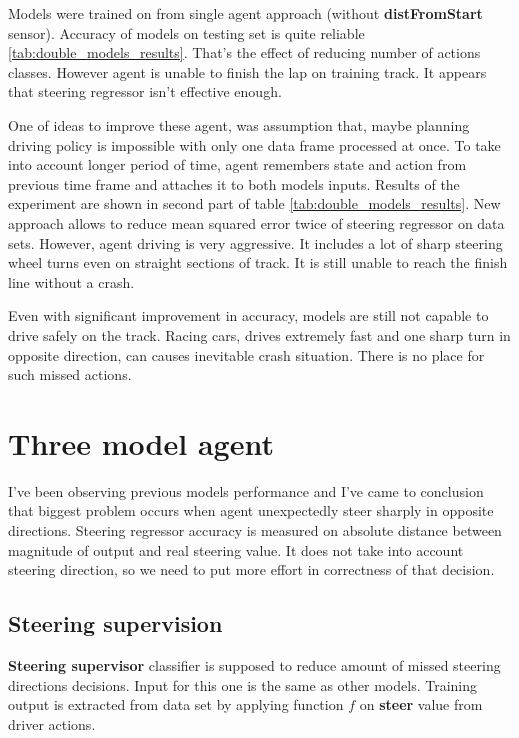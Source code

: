 \documentclass[declaration,shortabstract,english,inz]{iithesis}
\begin{document}
Models were trained on from single agent approach (without \textbf{distFromStart} sensor).
Accuracy of models on testing set is quite reliable \ref{tab:double_models_results}.
That's the effect of reducing number of actions classes.
However agent is unable to finish the lap on training track.
It appears that steering regressor isn't effective enough.


One of ideas to improve these agent, was assumption that, maybe planning driving policy is impossible with only one data frame processed at once.
To take into account longer period of time, agent remembers state and action from previous time frame and attaches it to both models inputs.
Results of the experiment are shown in second part of table \ref{tab:double_models_results}.
New approach allows to reduce mean squared error twice of steering regressor on data sets.
However, agent driving is very aggressive.
It includes a lot of sharp steering wheel turns even on straight sections of track.
It is still unable to reach the finish line without a crash.

Even with significant improvement in accuracy, models are still not capable to drive safely on the track.
Racing cars, drives extremely fast and one sharp turn in opposite direction, can causes inevitable crash situation.
There is no place for such missed actions.
 

\section{Three model agent}

I've been observing previous models performance and I've came to conclusion that biggest problem occurs when agent unexpectedly steer sharply in opposite directions.
Steering regressor accuracy is measured on absolute distance between magnitude of output and real steering value.
It does not take into account steering direction, so we need to put more effort in correctness of that decision.

\subsection{Steering supervision}


\textbf{Steering supervisor} classifier is supposed to reduce amount of missed steering directions decisions.
Input for this one is the same as other models.
Training output is extracted from data set by applying function $f$ on \textbf{steer} value from driver actions.
\end{document}
